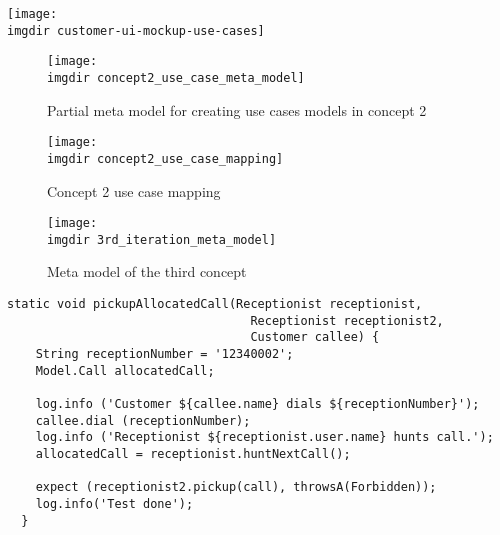 \documentclass[aspectratio=43]{beamer}
\newcommand{\imgdir}{../Thesis/img/}
\begin{document}
\texttt{[image: \\imgdir customer-ui-mockup-use-cases]}

\begin{figure}[h]
  \centering
  \texttt{[image: \\imgdir concept2\_use\_case\_meta\_model]}
  \caption{Partial meta model for creating use cases models in concept 2}
  \label{fig:concept2_use_case_meta_model}
\end{figure}

\begin{figure}[!htbp]
  \centering
  \texttt{[image: \\imgdir concept2\_use\_case\_mapping]}
  \caption{Concept 2 use case mapping}
  \label{fig:concept2_use_case_mapping}
\end{figure}

\begin{figure}[!htbp]
  \centering
  \texttt{[image: \\imgdir 3rd\_iteration\_meta\_model]}
  \caption{Meta model of the third concept}
  \label{fig:3rd_iteration_meta_model}
\end{figure}

\begin{lstlisting}[style=Dart, caption=Test code for single call allocation,label={lst:test-code-single-call-allocation}]
  static void pickupAllocatedCall(Receptionist receptionist, 
                                  Receptionist receptionist2, 
                                  Customer callee) {
    String receptionNumber = '12340002';
    Model.Call allocatedCall;
    
    log.info ('Customer ${callee.name} dials ${receptionNumber}');
    callee.dial (receptionNumber);
    log.info ('Receptionist ${receptionist.user.name} hunts call.');
    allocatedCall = receptionist.huntNextCall();
   
    expect (receptionist2.pickup(call), throwsA(Forbidden));
    log.info('Test done');
  }
\end{lstlisting}

\end{document}
